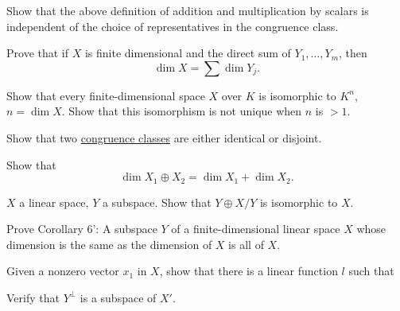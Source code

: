   \begin{exercise}[Lax 1.15] 
    Show that the above definition of addition and multiplication by scalars is independent of the choice of representatives in the congruence class.
  \end{exercise}

  \begin{exercise}[Lax 1.11] 
    Prove that if $X$ is finite dimensional and the direct sum of $Y_1,\ldots,Y_m$, then
    \begin{equation}
      \dim X = \sum \dim Y_j.
    \end{equation}
  \end{exercise}

  \begin{exercise}[Lax 1.12] 
    Show that every finite-dimensional space $X$ over $K$ is isomorphic to $K^n$, $n = \dim X$. Show that this isomorphism is not unique when $n$ is $>1$.
  \end{exercise}

  \begin{exercise}[Lax 1.14] 
    Show that two \hyperref[dg-def:congruence-classes]{congruence classes} are either identical or disjoint.
  \end{exercise}

  \begin{exercise}[Lax 1.18] 
    Show that
    \begin{equation}
      \dim X_1 \oplus X_2 = \dim X_1 + \dim X_2.
    \end{equation}
  \end{exercise}

  \begin{exercise}[Lax 1.19] 
    $X$ a linear space, $Y$ a subspace. Show that $Y \oplus X/Y$ is isomorphic to $X$.
  \end{exercise}

  \begin{exercise}[Lax 1.17] 
    Prove Corollary 6': A subspace $Y$ of a finite-dimensional linear space $X$ whose dimension is the same as the dimension of $X$ is all of $X$.
  \end{exercise}

  \begin{exercise}[Lax 2.1] 
    Given a nonzero vector $x_1$ in $X$, show that there is a linear function $l$ such that 
  \end{exercise}

  \begin{exercise}[Lax 2.2] 
    Verify that $Y^\perp$ is a subspace of $X'$.
  \end{exercise}


